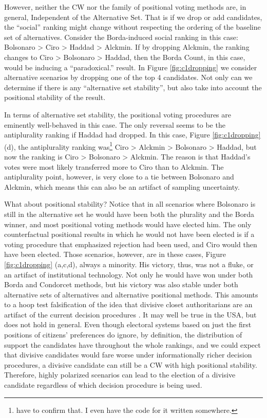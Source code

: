 \documentclass[hidelinks,11pt]{article}
\begin{document}
However, neither the CW nor the family of positional voting methods are, in
general, Independent of the Alternative Set\parencite{kaminski2015empirical}.
That is if we drop or add candidates, the ``social'' ranking might change
without respecting the ordering of the baseline set of alternatives. Consider
the Borda-induced social ranking in this case: Bolsonaro > Ciro > Haddad >
Alckmin. If by dropping Alckmin, the ranking changes to Ciro > Bolsonaro >
Haddad, then the Borda Count, in this case, would be inducing a ``paradoxical.''
result. In Figure \ref{fig:c1dropping} we consider alternative scenarios by
dropping one of the top 4 candidates. Not only can we determine if there is any ``alternative set stability'', but also take into account the positional stability of the result.

In terms of alternative set stability, the positional voting
procedures are eminently well-behaved in this case. The only reversal seems to be the
antiplurality ranking if Haddad had dropped. In this case, Figure
\ref{fig:c1dropping} (d), the antiplurality ranking was\footnote{\texts have to
  confirm that. I even have the code for it written somewhere.} Ciro > Alckmin >
Bolsonaro > Haddad, but now the ranking is Ciro > Bolsonaro > Alckmin. The
reason is that Haddad's votes were most likely transferred more to Ciro
than to Alckmin. The antiplurality point, however, is very close to a tie
between Bolsonaro and Alckmin, which means this can also be an artifact
of sampling uncertainty.


What about positional stability? Notice that in all scenarios where Bolsonaro is still in the alternative set he would have been both the plurality and the Borda winner, and most positional voting methods would have elected him. The only counterfactual positional results in which he would not have been elected is if a voting procedure that emphasized rejection had been used, and Ciro would then have been elected. Those scenarios, however, are in these cases, Figure \ref{fig:c1dropping} (a,c,d), always a minority. His victory, thus, was not a fluke, or an artifact of institutional technology. Not only he would have won under both Borda and Condorcet methods, but his victory was also stable under both alternative sets of alternatives and alternative positional methods. This amounts to a hoop test falsification of the idea that divisive closet authoritarians are an artifact of the current decision procedures \parencite{mahoney2006tale}. It may well be true in the USA, but does not hold in general. Even though electoral systems based on just the first positions of citizens' preferences do ignore, by definition, the distribution of support the candidates have throughout the whole rankings, and we could expect that divisive candidates would fare worse under informationally richer decision procedures, a divisive candidate can still be a CW with high positional stability. Therefore, highly polarized scenarios can lead to the election of a divisive candidate regardless of which decision procedure is being used.
\end{document}
